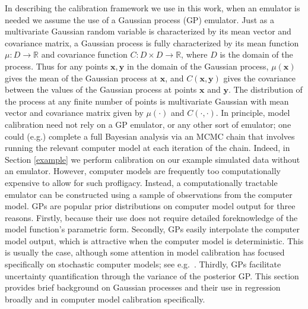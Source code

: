\documentclass[12pt]{article}
\begin{document}
In describing the calibration framework we use in this work, when an emulator is needed we assume the use of a Gaussian process (GP) emulator.
%
Just as a multivariate Gaussian random variable is characterized by its mean vector and covariance matrix, a Gaussian process is fully characterized by its mean function $\mu:D\to \mathbb R$ and covariance function $C:D\times D\to \mathbb R$, where $D$ is the domain of the process. 
%
Thus for any points $\mathbf x,\mathbf y$ in the domain of the Gaussian process, $\mu(\mathbf x)$ gives the mean of the Gaussian process at $\mathbf x$, and $C(\mathbf x, \mathbf y)$ gives the covariance between the values of the Gaussian process at points $\mathbf x$ and $\mathbf y$.
%
The distribution of the process at any finite number of points is multivariate Gaussian with mean vector and covariance matrix given by $\mu(\cdot)$ and $C(\cdot,\cdot)$.
%
In principle, model calibration need not rely on a GP emulator, or any other sort of emulator; one could (e.g.) complete a full Bayesian analysis via an MCMC chain that involves running the relevant computer model at each iteration of the chain. 
%
Indeed, in Section \ref{example} we perform calibration on our example simulated data without an emulator.
%
However, computer models are frequently too computationally expensive to allow for such profligacy.
%
Instead, a computationally tractable emulator can be constructed using a sample of observations from the computer model. 
%
GPs are popular prior distributions on computer model output for three reasons.
%
Firstly, because their use does not require detailed foreknowledge of the model function's parametric form. 
%
Secondly, GPs easily interpolate the computer model output, which is attractive when the computer model is deterministic. 
%
This is usually the case, although some attention in model calibration has focused specifically on stochastic computer models; see e.g.\ \cite{Pratola2018}. 
%
Thirdly, GPs facilitate uncertainty quantification through the variance of the posterior GP. 
%
This section provides brief background on Gaussian processes and their use in regression broadly and in computer model calibration specifically.
%
\end{document}

